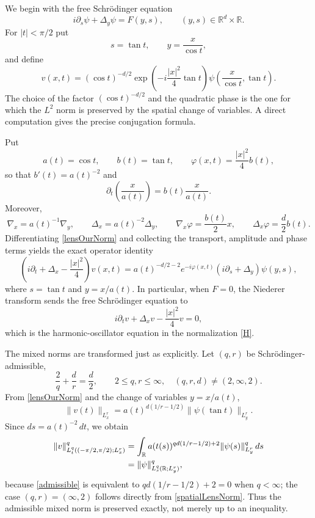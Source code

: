 \documentclass[11pt,a4paper]{amsart}
\def \phi {\varphi}
\newcommand{\Rm}{\mathbb R^d}
\newcommand{\p}{\partial}
\numberwithin{equation}{section}
\numberwithin{equation}{section}
\begin{document}
We begin with the free Schr\"odinger equation
\begin{equation}\label{freeLens}
 i\p_s\psi+\Delta_y\psi=F(y,s),\qquad (y,s)\in\Rm\times\mathbb R.
\end{equation}
For $|t|<\pi/2$ put
\begin{equation}\label{Niederer}
 s=\tan t,\qquad y=\frac{x}{\cos t},
\end{equation}
and define
\begin{equation}\label{lensOurNorm}
 v(x,t)=(\cos t)^{-d/2}\exp\left(-i\frac{|x|^2}{4}\tan t\right)
 \psi\left(\frac{x}{\cos t},\tan t\right).
\end{equation}
The choice of the factor $(\cos t)^{-d/2}$ and the quadratic phase is the one for which the $L^2$ norm is preserved by the spatial change of variables.  A direct computation gives the precise conjugation formula.

Put
\[
 a(t)=\cos t,
 \qquad b(t)=\tan t,
 \qquad \phi(x,t)=\frac{|x|^2}{4}b(t),
\]
so that $b'(t)=a(t)^{-2}$ and
\[
 \partial_t\left(\frac{x}{a(t)}\right)=b(t)\frac{x}{a(t)}.
\]
Moreover,
\[
 \nabla_x=a(t)^{-1}\nabla_y,
 \qquad
 \Delta_x=a(t)^{-2}\Delta_y,
 \qquad
 \nabla_x\phi=\frac{b(t)}2x,
 \qquad
 \Delta_x\phi=\frac d2b(t).
\]
Differentiating \eqref{lensOurNorm} and collecting the transport, amplitude and phase terms yields the exact operator identity
\begin{equation}\label{lensOperatorIdentity}
 \left(i\p_t+\Delta_x-\frac{|x|^2}{4}\right)v(x,t)
 =a(t)^{-d/2-2}e^{-i\phi(x,t)}
 \left(i\p_s+\Delta_y\right)\psi(y,s),
\end{equation}
where $s=\tan t$ and $y=x/a(t)$.  In particular, when $F=0$, the Niederer transform sends the free Schr\"odinger equation to
\begin{equation}\label{HOLens}
 i\p_t v+\Delta_xv-\frac{|x|^2}{4}v=0,
\end{equation}
which is the harmonic-oscillator equation in the normalization \eqref{H}.

The mixed norms are transformed just as explicitly.  Let $(q,r)$ be Schr\"odinger-admissible,
\begin{equation}\label{admissible}
 \frac2q+\frac dr=\frac d2,
 \qquad 2\le q,r\le\infty,\quad (q,r,d)\ne(2,\infty,2).
\end{equation}
From \eqref{lensOurNorm} and the change of variables $y=x/a(t)$,
\begin{equation}\label{spatialLensNorm}
 \|v(t)\|_{L^r_x}
 =a(t)^{d(1/r-1/2)}\|\psi(\tan t)\|_{L^r_y}.
\end{equation}
Since $ds=a(t)^{-2}\,dt$, we obtain
\begin{align}
 \|v\|_{L^q_t(( -\pi/2,\pi/2);L^r_x)}^q
 &=\int_{\mathbb R}a(t(s))^{qd(1/r-1/2)+2}
   \|\psi(s)\|_{L^r_y}^q\,ds \notag\\
 &=\|\psi\|_{L^q_s(\mathbb R;L^r_y)}^q,
 \label{lensnorm}
\end{align}
because \eqref{admissible} is equivalent to
$qd(1/r-1/2)+2=0$ when $q<\infty$; the case $(q,r)=(\infty,2)$ follows directly from \eqref{spatialLensNorm}.  Thus the admissible mixed norm is preserved exactly, not merely up to an inequality.
\end{document}
